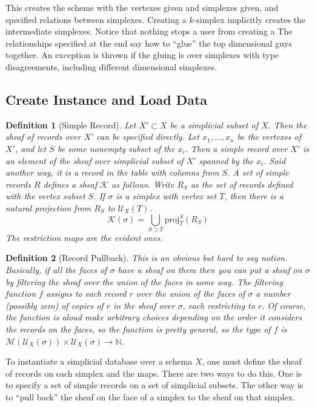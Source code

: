 \documentclass[a4paper,12pt]{article}
\theoremstyle{mydef}
\newtheorem{Def}{Definition}[section]
\theoremstyle{myremark}
\begin{document}
This creates the scheme with the vertexes given and simplexes given, and specified relations between simplexes. 
Creating a $k$-simplex implicitly creates the intermediate simplexes.
Notice that nothing stops a user from creating a 
The relationships specified at the end say how to ``glue'' the top dimensional guys together.
An exception is thrown if the gluing is over simplexes with type disagreements, including different dimensional simplexes.

\subsection{Create Instance and Load Data}


\begin{Def}[Simple Record]
  Let $X'\subset X$ be a simplicial subset of $X$.
  Then the sheaf of records over $X'$ can be specified directly.
  Let $x_1,...,x_n$ be the vertexes of $X'$, and let $S$ be some nonempty subset of the $x_i$.
  Then a simple record over $X'$ is an element of the sheaf over simplicial subset of $X'$ spanned by the $x_i$.
  Said another way, it is a record in the table with columns from $S$.
  A set of simple records $R$ defines a sheaf $\mathcal{K}$ as follows. 
  Write $R_S$ as the set of records defined with the vertex subset $S$.
  If $\sigma$ is a simplex with vertex set $T$, then there is a natural projection from $R_S$ to $\mathcal{U}_X(T)$.  
  \[\mathcal{K}(\sigma)=\bigcup_{S\supset T} \mbox{proj}^S_T(R_S)\]
  The restriction maps are the evident ones.  
\end{Def}

\begin{Def}[Record Pullback]
  This is an obvious but hard to say notion.
  Basically, if all the faces of $\sigma$ have a sheaf on them then you can put a sheaf on $\sigma$ by filtering the sheaf over the union of the faces in some way.
  The filtering function $f$ assigns to each record $r$ over the union of the faces of $\sigma$ a number (possibly zero) of copies of $r$ in the sheaf over $\sigma$, each restricting to $r$.
  Of course, the function is aloud make arbitrary choices depending on the order it considers the records on the faces, so the function is pretty general, so the type of $f$ is $\mathcal{M}(\mathcal{U}_X(\sigma))\times\mathcal{U}_X(\sigma)\to \mathbb{N}$.  
\end{Def}

To instantiate a simplicial database over a schema $X$, one must define the sheaf of records on each simplex and the maps.
There are two ways to do this.
One is to specify a set of simple records on a set of simplicial subsets.
The other way is to ``pull back'' the sheaf on the face of a simplex to the sheaf on that simplex.
\end{document}
